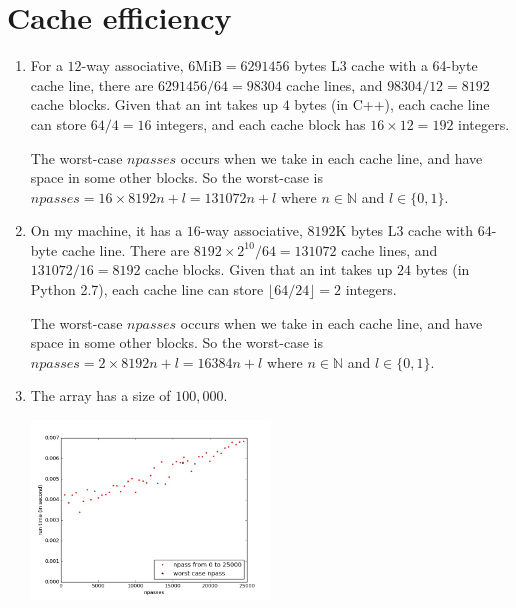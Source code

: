 \documentclass{article}    %
\begin{document}
\section{Cache efficiency}

\begin{enumerate}
	\item For a $12$-way associative, $6\mathrm{MiB} = 6291456$ bytes L3 cache with a 64-byte cache line, there are $6291456/64 = 98304$ cache lines, and $98304/12 = 8192$ cache blocks. Given that an int takes up $4$ bytes (in C++), each cache line can store $64/4 = 16$ integers, and each cache block has $16 \times 12 = 192$ integers. 
	
	The worst-case $npasses$ occurs when we take in each cache line, and have space in some other blocks. So the worst-case is $npasses = 16 \times 8192 n + l = 131072n + l$ where $n \in \mathbb{N}$ and $l \in \{0,1\}$.
	
	\item On my machine, it has a $16$-way associative, $8192$K bytes L3 cache with $64$-byte cache line. There are $8192 \times 2^{10}/64 = 131072$ cache lines, and $131072/16 = 8192$ cache blocks. Given that an int takes up $24$ bytes (in Python 2.7), each cache line can store $\lfloor64/24\rfloor = 2$ integers.
	
	The worst-case $npasses$ occurs when we take in each cache line, and have space in some other blocks. So the worst-case is $npasses = 2 \times 8192 n + l = 16384n + l$ where $n \in \mathbb{N}$ and $l \in \{0,1\}$.
	
	\item The array has a size of $100,000$. \\ 
        \begin{minipage}[t]{\linewidth}
		\centering
		\includegraphics[width=0.5\textwidth]{cache_timing.jpg}
	\end{minipage}
	
\end{enumerate}
\end{document}

